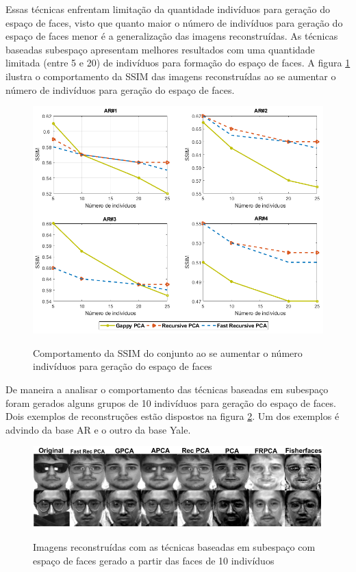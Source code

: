 Essas técnicas enfrentam limitação da quantidade indivíduos para geração do espaço de faces, visto que quanto maior o número de indivíduos para geração do espaço de faces menor é a generalização das imagens reconstruídas. As técnicas baseadas subespaço apresentam melhores resultados com uma quantidade limitada (entre 5 e 20) de indivíduos para formação do espaço de faces. A figura \ref{fig:ssim_por_individuos2} ilustra o comportamento da SSIM das imagens reconstruídas ao se aumentar o número de indivíduos para geração do espaço de faces.

\begin{figure}[H]
\centering
\caption{Comportamento da SSIM do conjunto ao se aumentar o número indivíduos para geração do espaço de faces}
\includegraphics[scale=0.55]{imgs4/ssim_por_individuos}
\label{fig:ssim_por_individuos2}
\end{figure}



De maneira a analisar o comportamento das técnicas baseadas em subespaço foram gerados alguns grupos de 10 indivíduos para geração do espaço de faces. Dois exemplos de reconstruções estão dispostos na figura \ref{fig:reconstrucoes}. Um dos exemplos é advindo da base AR e o outro da base Yale.

\begin{figure}[H]
\centering
\caption{Imagens reconstruídas com as técnicas baseadas em subespaço com espaço de faces gerado a partir das faces de 10 indivíduos}
\includegraphics[scale=0.7]{imgs/reconstrucoes2.png}
\label{fig:reconstrucoes}
\end{figure}

